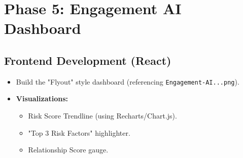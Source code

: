 \documentclass[11pt,a4paper]{article}
\begin{document}
\section{Phase 5: Engagement AI Dashboard}
\subsection{Frontend Development (React)}
\begin{itemize}
    \item Build the "Flyout" style dashboard (referencing \texttt{Engagement-AI...png}).
    \item \textbf{Visualizations:}
    \begin{itemize}
        \item Risk Score Trendline (using Recharts/Chart.js).
        \item "Top 3 Risk Factors" highlighter.
        \item Relationship Score gauge.
    \end{itemize}
\end{itemize}
\end{document}

